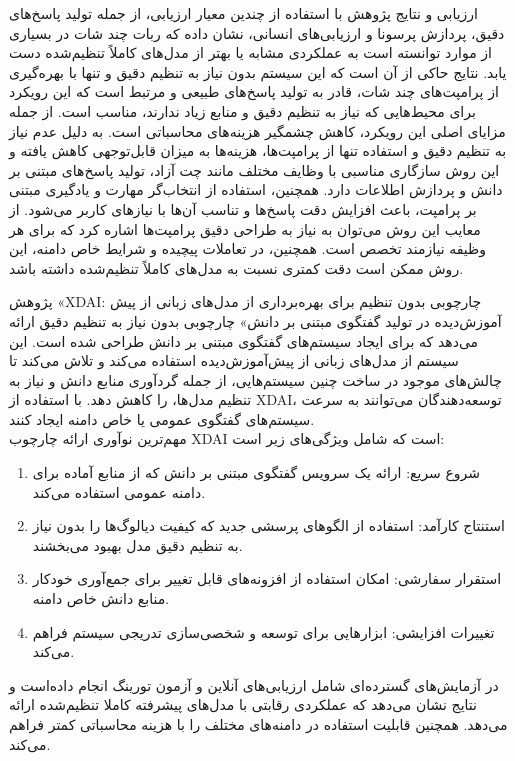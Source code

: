 ارزیابی و نتایج پژوهش با استفاده از چندین معیار ارزیابی، از جمله تولید پاسخ‌های دقیق، پردازش پرسونا و ارزیابی‌های انسانی، نشان داده که ربات چند شات در بسیاری از موارد توانسته است به عملکردی مشابه یا بهتر از مدل‌های کاملاً تنظیم‌شده دست یابد. نتایج حاکی از آن است که این سیستم بدون نیاز به تنظیم دقیق و تنها با بهره‌گیری از پرامپت‌های چند شات، قادر به تولید پاسخ‌های طبیعی و مرتبط است که این رویکرد برای محیط‌هایی که نیاز به تنظیم دقیق و منابع زیاد ندارند، مناسب است.
\newline
از جمله مزایای اصلی این رویکرد، کاهش چشمگیر هزینه‌های محاسباتی است. به دلیل عدم نیاز به تنظیم دقیق و استفاده تنها از پرامپت‌ها، هزینه‌ها به میزان قابل‌توجهی کاهش یافته و این روش سازگاری مناسبی با وظایف مختلف مانند چت آزاد، تولید پاسخ‌های مبتنی بر دانش و پردازش اطلاعات دارد. همچنین، استفاده از انتخاب‌گر مهارت و یادگیری مبتنی بر پرامپت، باعث افزایش دقت پاسخ‌ها و تناسب آن‌ها با نیازهای کاربر می‌شود. 
\newline
از معایب این روش می‌توان به نیاز به طراحی دقیق پرامپت‌ها اشاره کرد که برای هر وظیفه نیازمند تخصص است. همچنین، در تعاملات پیچیده و شرایط خاص دامنه، این روش ممکن است دقت کمتری نسبت به مدل‌های کاملاً تنظیم‌شده داشته باشد.

پژوهش «XDAI: چارچوبی بدون تنظیم برای بهره‌برداری از مدل‌های زبانی از پیش آموزش‌دیده در تولید گفتگوی مبتنی بر دانش»%
\cite{yu2022xdai}
چارچوبی بدون نیاز به تنظیم دقیق ارائه می‌دهد که برای ایجاد سیستم‌های گفتگوی مبتنی بر دانش طراحی شده است. این سیستم از مدل‌های زبانی از پیش‌آموزش‌دیده استفاده می‌کند و تلاش می‌کند تا چالش‌های موجود در ساخت چنین سیستم‌هایی، از جمله گردآوری منابع دانش و نیاز به تنظیم مدل‌ها، را کاهش دهد. با استفاده از XDAI، توسعه‌دهندگان می‌توانند به سرعت سیستم‌های گفتگوی عمومی یا خاص دامنه ایجاد کنند. \\


مهم‌ترین نوآوری%
\cite{yu2022xdai}
 ارائه چارچوب XDAI است که شامل ویژگی‌های زیر است:
\begin{enumerate}
\item
 شروع سریع: ارائه یک سرویس گفتگوی مبتنی بر دانش که از منابع آماده برای دامنه عمومی استفاده می‌کند.
\item
 استنتاج کارآمد: استفاده از الگوهای پرسشی جدید که کیفیت دیالوگ‌ها را بدون نیاز به تنظیم دقیق مدل بهبود می‌بخشند.
\item
 استقرار سفارشی: امکان استفاده از افزونه‌های قابل تغییر برای جمع‌آوری خودکار منابع دانش خاص دامنه.
\item
 تغییرات افزایشی: ابزارهایی برای توسعه و شخصی‌سازی تدریجی سیستم فراهم می‌کند.
\end{enumerate}
در%
\cite{yu2022xdai}
 آزمایش‌های گسترده‌ای شامل ارزیابی‌های آنلاین و آزمون تورینگ انجام داده‌است و نتایج نشان می‌دهد که عملکردی رقابتی با مدل‌های پیشرفته کاملا تنظیم‌شده ارائه می‌دهد. همچنین قابلیت استفاده در دامنه‌های مختلف را با هزینه محاسباتی کمتر فراهم می‌کند.

